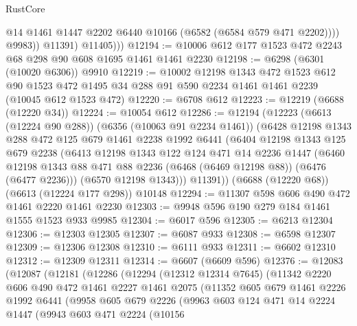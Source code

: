 \begin{lexlean}{RustCore}
\begin{coremodule}
                    @14
                    @1461
                    @1447
                    @2202
                    @6440
                    @10166
                    (@6582 (@6584 @579 @471 @2202))))
                @9983))
            @11391)
          @11405)))
@12194 := @10006 @612 @177 @1523 @472 @2243 @68 @298 @90 @608 @1695 @1461 @1461 @2230
@12198 := @6298 (@6301 (@10020 @6306)) @9910
@12219 := @10002
    @12198
    @1343
    @472
    @1523
    @612
    @90
    @1523
    @472
    @1495
    @34
    @288
    @91
    @590
    @2234
    @1461
    @1461
    @2239
    (@10045 @612 @1523 @472)
@12220 := @6708 @612
@12223 := @12219 (@6688 (@12220 @34))
@12224 := @10054 @612
@12286 := @12194
    (@12223
      (@6613 (@12224 @90 @288))
      (@6356 (@10063 @91 @2234 @1461))
      (@6428
        @12198
        @1343
        @288
        @472
        @125
        @679
        @1461
        @2238
        @1992
        @6441
        (@6404
          @12198
          @1343
          @125
          @679
          @2238
          (@6413
            @12198
            @1343
            @122
            @124
            @471
            @14
            @2236
            @1447
            (@6460 @12198 @1343 @88 @471 @88 @2236 (@6468 (@6469 @12198 @88)) (@6476 (@6477 @2236)))
            (@6570 @12198 @1343)))
        @11391))
    (@6688 (@12220 @68))
    (@6613 (@12224 @177 @298))
    @10148
@12294 := @11307 @598 @606 @490 @472 @1461 @2220 @1461 @2230
@12303 := @9948 @596 @190 @279 @184 @1461 @1555 @1523 @933 @9985
@12304 := @6017 @596
@12305 := @6213 @12304
@12306 := @12303 @12305
@12307 := @6087 @933
@12308 := @6598 @12307
@12309 := @12306 @12308
@12310 := @6111 @933
@12311 := @6602 @12310
@12312 := @12309 @12311
@12314 := @6607 (@6609 @596)
@12376 := @12083
    (@12087
      (@12181
        (@12286
          (@12294
            (@12312 @12314 @7645)
            (@11342
              @2220
              @606
              @490
              @472
              @1461
              @2227
              @1461
              @2075
              (@11352
                @605
                @679
                @1461
                @2226
                @1992
                @6441
                (@9958
                  @605
                  @679
                  @2226
                  (@9963
                    @603
                    @124
                    @471
                    @14
                    @2224
                    @1447
                    (@9943
                      @603
                      @471
                      @2224
                      (@10156

\end{coremodule}
\end{lexlean}
